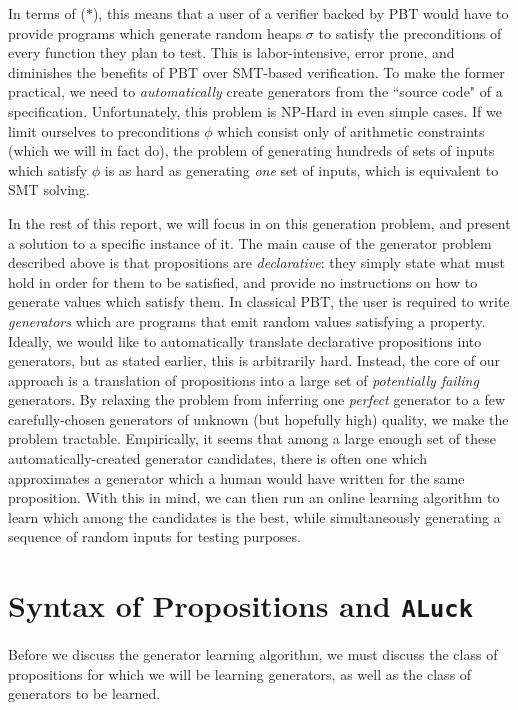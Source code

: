 \documentclass[sigconf,nonacm]{acmart}
\begin{document}
In terms of ($\ast$), this means that a user of a verifier backed by PBT would have to provide programs which generate random heaps $\sigma$ to satisfy the preconditions of every function they plan to test. This is labor-intensive, error prone, and diminishes the benefits of PBT over SMT-based verification. To make the former practical, we need to \textit{automatically} create generators from the ``source code" of a specification. Unfortunately, this problem is NP-Hard in even simple cases. If we limit ourselves to preconditions $\phi$ which consist only of arithmetic constraints (which we will in fact do), the problem of generating hundreds of sets of inputs which satisfy $\phi$ is as hard as generating \textit{one} set of inputs, which is equivalent to SMT solving.

In the rest of this report, we will focus in on this generation problem, and present a solution to a specific instance of it. The main cause of the generator problem described above is that propositions are \textit{declarative}: they simply state what must hold in order for them to be satisfied, and provide no instructions on how to generate values which satisfy them. In classical PBT, the user is required to write \textit{generators} which are programs that emit random values satisfying a property. Ideally, we would like to automatically translate declarative propositions into generators, but as stated earlier, this is arbitrarily hard. Instead, the core of our approach is a translation of propositions into a large set of \textit{potentially failing} generators. By relaxing the problem from inferring one \textit{perfect} generator to a few carefully-chosen generators of unknown (but hopefully high) quality, we make the problem tractable. Empirically, it seems that among a large enough set of these automatically-created generator candidates, there is often one which approximates a generator which a human would have written for the same proposition. With this in mind, we can then run an online learning algorithm to learn which among the candidates is the best, while simultaneously generating a sequence of random inputs for testing purposes.

\section{Syntax of Propositions and \texttt{ALuck}}
\label{sec:luck}

Before we discuss the generator learning algorithm, we must discuss the class of propositions for which we will be learning generators, as well as the class of generators to be learned.
\end{document}

